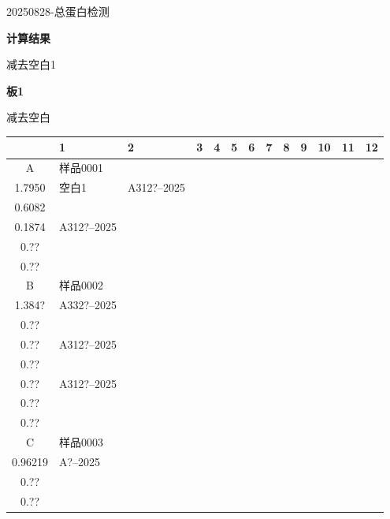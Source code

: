 \documentclass[UTF8,10pt,a4paper,fontset=fandol]{ctexart}
\newcommand{\fieldvalue}[1]{#1}
\begin{document}

\newpage

\begin{flushleft}
20250828-总蛋白检测
\end{flushleft}

\textbf{计算结果}

减去空白1

\textbf{板1}

减去空白

\begin{center}
\small
\begin{tabular}{c|p{1.35cm}|p{1.35cm}|p{1.35cm}|p{1.35cm}|p{1.35cm}|p{1.35cm}|p{1.35cm}|p{1.35cm}|p{1.35cm}|p{1.35cm}|p{1.35cm}|p{1.35cm}}
 & 1 & 2 & 3 & 4 & 5 & 6 & 7 & 8 & 9 & 10 & 11 & 12\\
\hline
A &
\fieldvalue{样品0001\\1.7950}
&
\fieldvalue{空白1}
&
\fieldvalue{A312?--2025\\0.6082\\0.1874}
&
\fieldvalue{A312?--2025\\0.??\\0.??}
& & & & & & & &\\
\hline
B &
\fieldvalue{样品0002\\1.384?}
&
\fieldvalue{A332?--2025\\0.??\\0.??}
&
\fieldvalue{A312?--2025\\0.??\\0.??}
&
\fieldvalue{A312?--2025\\0.??\\0.??}
& & & & & & & &\\
\hline
C &
\fieldvalue{样品0003\\0.96219}
&
\fieldvalue{A?--2025\\0.??\\0.??}

\end{tabular}
\end{center}
\end{document}
